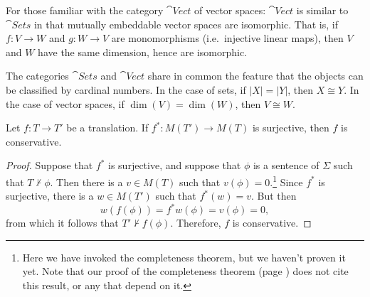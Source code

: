 \begin{aside} For those familiar with the category $\cat{Vect}$ of
  vector spaces: $\cat{Vect}$ is similar to $\cat{Sets}$ in that
  mutually embeddable vector spaces are isomorphic.  That is, if
  $f:V\to W$ and $g:W\to V$ are monomorphisms (i.e.\ injective linear
  maps), then $V$ and $W$ have the same dimension, hence are
  isomorphic.

  The categories $\cat{Sets}$ and $\cat{Vect}$ share in common the
  feature that the objects can be classified by cardinal numbers.  In
  the case of sets, if $|X|=|Y|$, then $X\cong Y$.  In the case of
  vector spaces, if $\dim (V)=\dim (W)$, then $V\cong W$.
\end{aside}

\begin{prop} Let $f:T\to T'$ be a translation.  If $f^*:M(T')\to M(T)$
  is surjective, then $f$ is conservative. \end{prop}

\begin{proof} Suppose that $f^*$ is surjective, and suppose that
  $\phi$ is a sentence of $\Sigma$ such that $T\not\vdash \phi$.  Then
  there is a $v\in M(T)$ such that $v(\phi )=0$.\footnote{Here we have
    invoked the completeness theorem, but we haven't proven it yet.
    Note that our proof of the completeness theorem (page
    \pageref{page:complete}) does not cite this result, or any that
    depend on it.}  Since $f^*$ is surjective, there is a $w\in M(T')$
  such that $f^*(w)=v$.  But then
  \[ w(f(\phi )) = f^*w(\phi ) = v(\phi )=0 ,\] from which it follows
  that $T'\not\vdash f(\phi )$.  Therefore, $f$ is conservative.
\end{proof}



